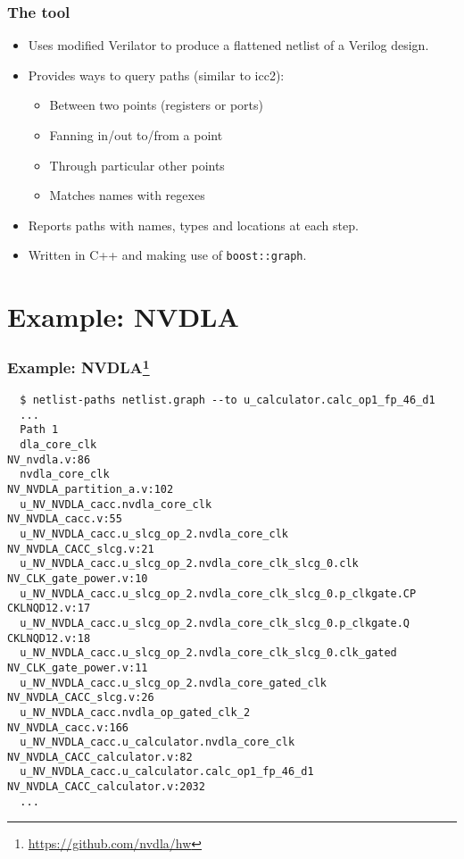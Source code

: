 \documentclass[professionalfonts]{beamer}
\begin{document}
\begin{frame}
  \frametitle{The tool}
  \begin{itemize}
  \item Uses modified Verilator to produce a flattened netlist of a Verilog design.
  \item Provides ways to query paths (similar to icc2):
    \begin{itemize}
    \item Between two points (registers or ports)
    \item Fanning in/out to/from a point
    \item Through particular other points
    \item Matches names with regexes
    \end{itemize}
  \item Reports paths with names, types and locations at each step.
  \item Written in C++ and making use of \texttt{boost::graph}.
  \end{itemize}
\end{frame}

\section{Example: NVDLA}
\begin{frame}[fragile]
  \frametitle{Example: NVDLA\footnote{\url{https://github.com/nvdla/hw}}}
  \tiny
  \begin{verbatim}
  $ netlist-paths netlist.graph --to u_calculator.calc_op1_fp_46_d1
  ...
  Path 1
  dla_core_clk                                                   NV_nvdla.v:86
  nvdla_core_clk                                                 NV_NVDLA_partition_a.v:102
  u_NV_NVDLA_cacc.nvdla_core_clk                                 NV_NVDLA_cacc.v:55
  u_NV_NVDLA_cacc.u_slcg_op_2.nvdla_core_clk                     NV_NVDLA_CACC_slcg.v:21
  u_NV_NVDLA_cacc.u_slcg_op_2.nvdla_core_clk_slcg_0.clk          NV_CLK_gate_power.v:10
  u_NV_NVDLA_cacc.u_slcg_op_2.nvdla_core_clk_slcg_0.p_clkgate.CP CKLNQD12.v:17
  u_NV_NVDLA_cacc.u_slcg_op_2.nvdla_core_clk_slcg_0.p_clkgate.Q  CKLNQD12.v:18
  u_NV_NVDLA_cacc.u_slcg_op_2.nvdla_core_clk_slcg_0.clk_gated    NV_CLK_gate_power.v:11
  u_NV_NVDLA_cacc.u_slcg_op_2.nvdla_core_gated_clk               NV_NVDLA_CACC_slcg.v:26
  u_NV_NVDLA_cacc.nvdla_op_gated_clk_2                           NV_NVDLA_cacc.v:166
  u_NV_NVDLA_cacc.u_calculator.nvdla_core_clk                    NV_NVDLA_CACC_calculator.v:82
  u_NV_NVDLA_cacc.u_calculator.calc_op1_fp_46_d1                 NV_NVDLA_CACC_calculator.v:2032
  ...
  \end{verbatim}
\end{frame}
\end{document}
